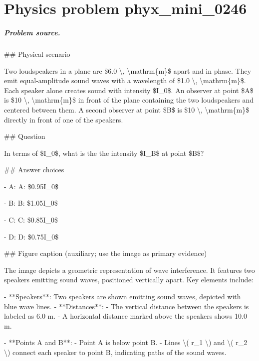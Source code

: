 
\chapter{Physics problem phyx\_mini\_0246}
\label{ch:PhyXMiniProblems_problem_phyx_mini_0246}

\paragraph{Problem source.}
\#\# Physical scenario

Two loudspeakers in a plane are \$6.0 \textbackslash{}, \textbackslash{}mathrm\{m\}\$ apart and in phase. They emit equal-amplitude sound waves with a wavelength of \$1.0 \textbackslash{}, \textbackslash{}mathrm\{m\}\$. Each speaker alone creates sound with intensity \$I\_0\$. An observer at point \$A\$ is \$10 \textbackslash{}, \textbackslash{}mathrm\{m\}\$ in front of the plane containing the two loudspeakers and centered between them. A second observer at point \$B\$ is \$10 \textbackslash{}, \textbackslash{}mathrm\{m\}\$ directly in front of one of the speakers.

\#\# Question

In terms of \$I\_0\$, what is the the intensity \$I\_B\$ at point \$B\$?

\#\# Answer choices

- A: A: \$0.95I\_0\$

- B: B: \$1.05I\_0\$

- C: C: \$0.85I\_0\$

- D: D: \$0.75I\_0\$

\#\# Figure caption (auxiliary; use the image as primary evidence)

The image depicts a geometric representation of wave interference. It features two speakers emitting sound waves, positioned vertically apart. Key elements include:

- **Speakers**: Two speakers are shown emitting sound waves, depicted with blue wave lines.
- **Distances**: 
  - The vertical distance between the speakers is labeled as 6.0 m.
  - A horizontal distance marked above the speakers shows 10.0 m.

- **Points A and B**: 
  - Point A is below point B.
  - Lines \textbackslash{}( r\_1 \textbackslash{}) and \textbackslash{}( r\_2 \textbackslash{}) connect each speaker to point B, indicating paths of the sound waves.

